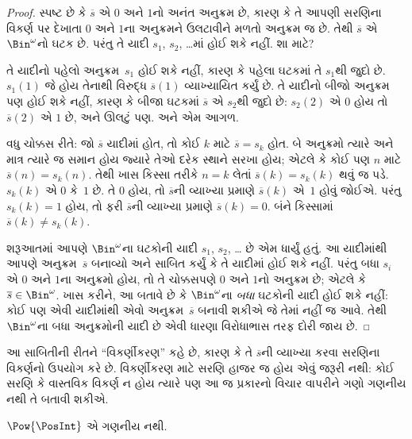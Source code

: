 \begin{proof}
સ્પષ્ટ છે કે $\overline{s}$ એ $0$ અને $1$નો અનંત અનુક્રમ છે,
કારણ કે તે આપણી સરણિના વિકર્ણ પર દેખાતા $0$ અને $1$ના
અનુક્રમને ઉલટાવીને મળતો અનુક્રમ જ છે. તેથી $\overline{s}$ એ
$\Bin^\omega$નો ઘટક છે. પરંતુ તે યાદી
$s_1$, $s_2$, \dots{}માં હોઈ શકે નહીં. શા માટે?

તે યાદીનો પહેલો અનુક્રમ~$s_1$ હોઈ શકે નહીં, કારણ કે પહેલા
ઘટકમાં તે $s_1$થી જુદો છે. $s_1(1)$ જે હોય તેનાથી
વિરુદ્ધ $\overline{s}(1)$ વ્યાખ્યાયિત કર્યું છે. તે યાદીનો
બીજો અનુક્રમ પણ હોઈ શકે નહીં, કારણ કે બીજા ઘટકમાં
$\overline{s}$ એ $s_2$થી જુદો છે: $s_2(2)$ એ $0$ હોય તો
$\overline{s}(2)$ એ $1$ છે, અને ઊલટું પણ. અને એમ આગળ.

વધુ ચોક્કસ રીતે: જો $\overline{s}$ યાદીમાં હોત, તો કોઈ $k$
માટે $\overline{s} = s_{k}$ હોત. બે અનુક્રમો ત્યારે અને માત્ર
ત્યારે જ સમાન હોય જ્યારે તેઓ દરેક સ્થાને સરખા હોય; એટલે કે કોઈ પણ
$n$ માટે $\overline{s}(n) = s_{k}(n)$. તેથી ખાસ કિસ્સા તરીકે
$n = k$ લેતાં $\overline{s}(k) = s_{k}(k)$ થવું જ પડે.
$s_k(k)$ એ $0$ કે~$1$ છે. તે $0$ હોય, તો $\overline{s}$ની
વ્યાખ્યા પ્રમાણે $\overline{s}(k)$ એ~$1$ હોવું જોઈએ. પરંતુ
$s_k(k) = 1$ હોય, તો ફરી $\overline{s}$ની વ્યાખ્યા પ્રમાણે
$\overline{s}(k) = 0$. બંને કિસ્સામાં
$\overline{s}(k) \neq s_{k}(k)$.

શરૂઆતમાં આપણે $\Bin^\omega$ના ઘટકોની યાદી
$s_1$, $s_2$, \dots{} છે એમ ધાર્યું હતું. આ યાદીમાંથી આપણે
અનુક્રમ~$\overline{s}$ બનાવ્યો અને સાબિત કર્યું કે તે યાદીમાં
હોઈ શકે નહીં. પરંતુ બધા $s_i$ એ $0$ અને $1$ના અનુક્રમો હોય,
તો તે ચોક્કસપણે $0$ અને $1$નો અનુક્રમ છે; એટલે કે
$\overline{s} \in \Bin^\omega$. ખાસ કરીને, આ બતાવે છે કે
$\Bin^\omega$ના \emph{બધા} ઘટકોની યાદી હોઈ શકે નહીં:
કોઈ પણ એવી યાદીમાંથી એવો અનુક્રમ~$\overline{s}$ બનાવી શકીએ
જે તેમાં નહીં જ આવે. તેથી $\Bin^\omega$ના બધા અનુક્રમોની યાદી
છે એવી ધારણા વિરોધાભાસ તરફ દોરી જાય છે.
\end{proof}

\begin{explain}
આ સાબિતીની રીતને ``વિકર્ણીકરણ'' કહે છે, કારણ કે તે
$\overline{s}$ની વ્યાખ્યા કરવા સરણિના વિકર્ણનો ઉપયોગ કરે છે.
વિકર્ણીકરણ માટે સરણિ હાજર જ હોય એવું જરૂરી નથી: કોઈ સરણિ કે
વાસ્તવિક વિકર્ણ ન હોય ત્યારે પણ આ જ પ્રકારનો વિચાર વાપરીને
ગણો ગણનીય નથી તે બતાવી શકીએ.
\end{explain}

\begin{thm}
$\Pow{\PosInt}$ એ ગણનીય નથી.
\end{thm}

